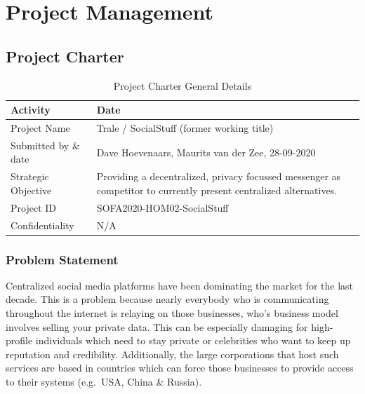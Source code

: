 

\chapter{Project Management}\label{ch:project-management}


\section{Project Charter}\label{sec:project-charter}

\begin{table}[htp]
    \centering
    \caption{Project Charter General Details}
    \begin{tabular}{@{}|l|l|@{}}
        \toprule
        \textbf{Activity} & \textbf{Date} \\
        \midrule
        Project Name & Trale / SocialStuff (former working title) \\
        \midrule
        Submitted by \& date & Dave Hoevenaars, Maurits van der Zee, 28-09-2020 \\
        \midrule
        Strategic Objective &
        \parbox[t]{8cm}{Providing a decentralized, privacy focussed messenger as competitor to currently present centralized alternatives.} \\
        \midrule
        Project ID & SOFA2020-HOM02-SocialStuff \\
        \midrule
        Confidentiality & N/A \\
        \bottomrule
    \end{tabular}
    \label{tab:my-table}
\end{table}

\subsection{Problem Statement}\label{subsec:problem-statement}

Centralized social media platforms have been dominating the market for the last decade.
This is a problem because nearly everybody who is communicating throughout the internet is relaying on those businesses,
who's business model involves selling your private data.
This can be especially damaging for high-profile individuals which need to stay private or celebrities who want to keep
up reputation and credibility.
Additionally, the large corporations that host such services are based in countries which can force those businesses to
provide access to their systems (e.g.\ USA, China \& Russia).

